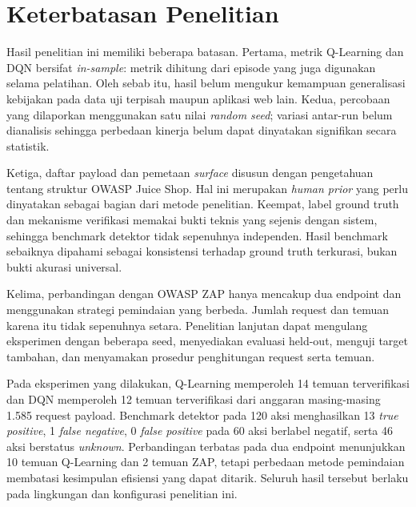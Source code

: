 \section{Keterbatasan Penelitian}

Hasil penelitian ini memiliki beberapa batasan. Pertama, metrik Q-Learning dan DQN bersifat \textit{in-sample}: metrik dihitung dari episode yang juga digunakan selama pelatihan. Oleh sebab itu, hasil belum mengukur kemampuan generalisasi kebijakan pada data uji terpisah maupun aplikasi web lain. Kedua, percobaan yang dilaporkan menggunakan satu nilai \textit{random seed}; variasi antar-run belum dianalisis sehingga perbedaan kinerja belum dapat dinyatakan signifikan secara statistik.

Ketiga, daftar payload dan pemetaan \textit{surface} disusun dengan pengetahuan tentang struktur OWASP Juice Shop. Hal ini merupakan \textit{human prior} yang perlu dinyatakan sebagai bagian dari metode penelitian. Keempat, label ground truth dan mekanisme verifikasi memakai bukti teknis yang sejenis dengan sistem, sehingga benchmark detektor tidak sepenuhnya independen. Hasil benchmark sebaiknya dipahami sebagai konsistensi terhadap ground truth terkurasi, bukan bukti akurasi universal.

Kelima, perbandingan dengan OWASP ZAP hanya mencakup dua endpoint dan menggunakan strategi pemindaian yang berbeda. Jumlah request dan temuan karena itu tidak sepenuhnya setara. Penelitian lanjutan dapat mengulang eksperimen dengan beberapa seed, menyediakan evaluasi held-out, menguji target tambahan, dan menyamakan prosedur penghitungan request serta temuan.

Pada eksperimen yang dilakukan, Q-Learning memperoleh 14 temuan terverifikasi dan DQN memperoleh 12 temuan terverifikasi dari anggaran masing-masing 1.585 request payload. Benchmark detektor pada 120 aksi menghasilkan 13 \textit{true positive}, 1 \textit{false negative}, 0 \textit{false positive} pada 60 aksi berlabel negatif, serta 46 aksi berstatus \textit{unknown}. Perbandingan terbatas pada dua endpoint menunjukkan 10 temuan Q-Learning dan 2 temuan ZAP, tetapi perbedaan metode pemindaian membatasi kesimpulan efisiensi yang dapat ditarik. Seluruh hasil tersebut berlaku pada lingkungan dan konfigurasi penelitian ini.
